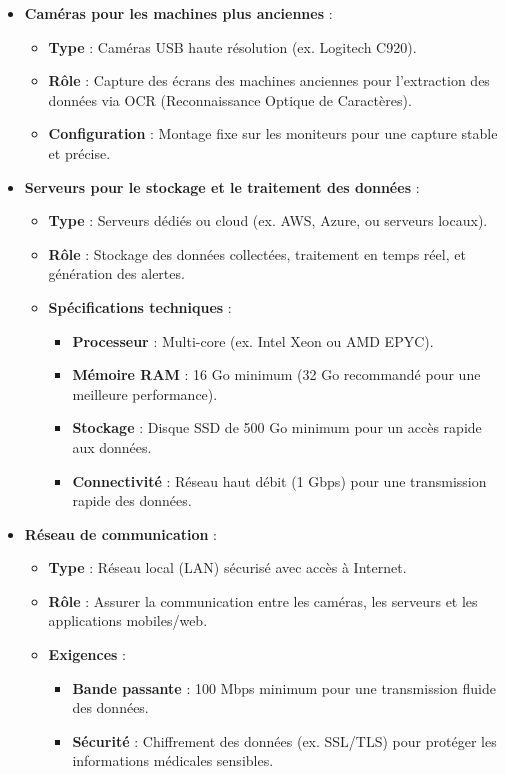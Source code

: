 \begin{itemize}
    \item \textbf{Caméras pour les machines plus anciennes} :
    \begin{itemize}
        \item \textbf{Type} : Caméras USB haute résolution (ex. Logitech C920).
        \item \textbf{Rôle} : Capture des écrans des machines anciennes pour l'extraction des données via OCR (Reconnaissance Optique de Caractères).
        \item \textbf{Configuration} : Montage fixe sur les moniteurs pour une capture stable et précise.
    \end{itemize}

    \item \textbf{Serveurs pour le stockage et le traitement des données} :
    \begin{itemize}
        \item \textbf{Type} : Serveurs dédiés ou cloud (ex. AWS, Azure, ou serveurs locaux).
        \item \textbf{Rôle} : Stockage des données collectées, traitement en temps réel, et génération des alertes.
        \item \textbf{Spécifications techniques} :
        \begin{itemize}
            \item \textbf{Processeur} : Multi-core (ex. Intel Xeon ou AMD EPYC).
            \item \textbf{Mémoire RAM} : 16 Go minimum (32 Go recommandé pour une meilleure performance).
            \item \textbf{Stockage} : Disque SSD de 500 Go minimum pour un accès rapide aux données.
            \item \textbf{Connectivité} : Réseau haut débit (1 Gbps) pour une transmission rapide des données.
        \end{itemize}
    \end{itemize}

    \item \textbf{Réseau de communication} :
    \begin{itemize}
        \item \textbf{Type} : Réseau local (LAN) sécurisé avec accès à Internet.
        \item \textbf{Rôle} : Assurer la communication entre les caméras, les serveurs et les applications mobiles/web.
        \item \textbf{Exigences} :
        \begin{itemize}
            \item \textbf{Bande passante} : 100 Mbps minimum pour une transmission fluide des données.
            \item \textbf{Sécurité} : Chiffrement des données (ex. SSL/TLS) pour protéger les informations médicales sensibles.
        \end{itemize}
    \end{itemize}


\end{itemize}
